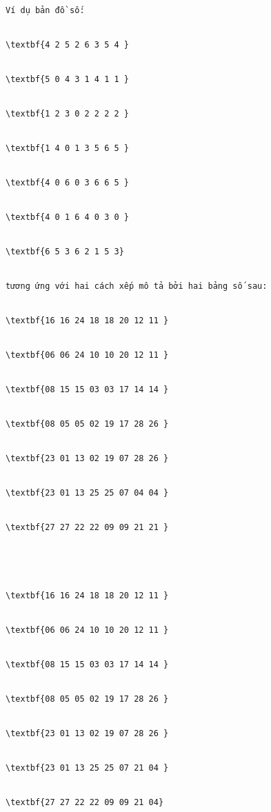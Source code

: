 \begin{verbatim}
Ví dụ bản đồ số:


\textbf{4 2 5 2 6 3 5 4 }


\textbf{5 0 4 3 1 4 1 1 }


\textbf{1 2 3 0 2 2 2 2 }


\textbf{1 4 0 1 3 5 6 5 }


\textbf{4 0 6 0 3 6 6 5 }


\textbf{4 0 1 6 4 0 3 0 }


\textbf{6 5 3 6 2 1 5 3} 


tương ứng với hai cách xếp mô tả bởi hai bảng số sau:


\textbf{16 16 24 18 18 20 12 11 }


\textbf{06 06 24 10 10 20 12 11 }


\textbf{08 15 15 03 03 17 14 14 }


\textbf{08 05 05 02 19 17 28 26 }


\textbf{23 01 13 02 19 07 28 26 }


\textbf{23 01 13 25 25 07 04 04 }


\textbf{27 27 22 22 09 09 21 21 }





\textbf{16 16 24 18 18 20 12 11 }


\textbf{06 06 24 10 10 20 12 11 }


\textbf{08 15 15 03 03 17 14 14 }


\textbf{08 05 05 02 19 17 28 26 }


\textbf{23 01 13 02 19 07 28 26 }


\textbf{23 01 13 25 25 07 21 04 }


\textbf{27 27 22 22 09 09 21 04}\end{verbatim}